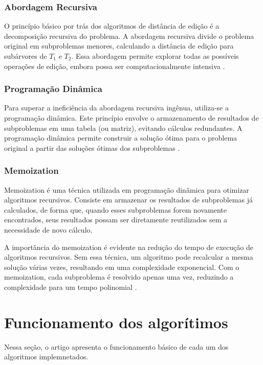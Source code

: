 \documentclass[12pt]{article}
\begin{document}
\subsubsection{Abordagem Recursiva}

O princípio básico por trás dos algoritmos de distância de edição é a decomposição recursiva do problema. A abordagem recursiva divide o problema original em subproblemas menores, calculando a distância de edição para subárvores de \( T_1 \) e \( T_2 \). Essa abordagem permite explorar todas as possíveis operações de edição, embora possa ser computacionalmente intensiva \cite{zhang1989simple}.

\subsubsection{Programação Dinâmica}

Para superar a ineficiência da abordagem recursiva ingênua, utiliza-se a programação dinâmica. Este princípio envolve o armazenamento de resultados de subproblemas em uma tabela (ou matriz), evitando cálculos redundantes. A programação dinâmica permite construir a solução ótima para o problema original a partir das soluções ótimas dos subproblemas \cite{cormen2009introduction}.

\subsubsection{Memoization}

Memoization é uma técnica utilizada em programação dinâmica para otimizar algoritmos recursivos. Consiste em armazenar os resultados de subproblemas já calculados, de forma que, quando esses subproblemas forem novamente encontrados, seus resultados possam ser diretamente reutilizados sem a necessidade de novo cálculo.

A importância do memoization é evidente na redução do tempo de execução de algoritmos recursivos. Sem essa técnica, um algoritmo pode recalcular a mesma solução várias vezes, resultando em uma complexidade exponencial. Com o memoization, cada subproblema é resolvido apenas uma vez, reduzindo a complexidade para um tempo polinomial \cite{ahuja1993network}.


\section{Funcionamento dos algorítimos}
Nessa seção, o artigo apresenta o funcionamento básico de cada um dos algoritmos implemnetados.
\end{document}

